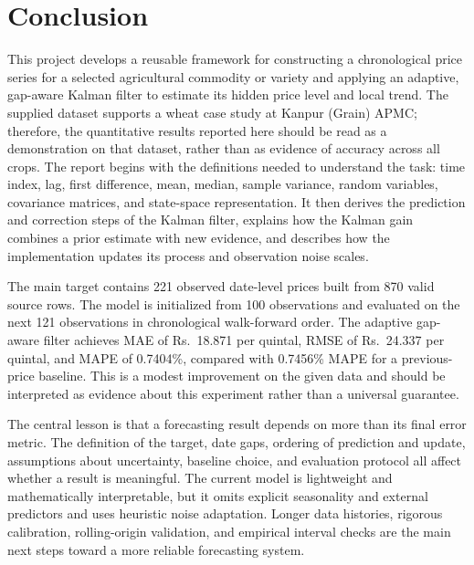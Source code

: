 \documentclass[12pt,a4paper,oneside]{report}
\numberwithin{equation}{chapter}
\numberwithin{figure}{chapter}
\numberwithin{table}{chapter}
\theoremstyle{definition}
\theoremstyle{plain}
\newcommand{\1}{\mathbf{1}}
\begin{document}
\chapter{Conclusion}
This project develops a reusable framework for constructing a chronological price series for a selected agricultural commodity or variety and applying an adaptive, gap-aware Kalman filter to estimate its hidden price level and local trend. The supplied dataset supports a wheat case study at Kanpur (Grain) APMC; therefore, the quantitative results reported here should be read as a demonstration on that dataset, rather than as evidence of accuracy across all crops. The report begins with the definitions needed to understand the task: time index, lag, first difference, mean, median, sample variance, random variables, covariance matrices, and state-space representation. It then derives the prediction and correction steps of the Kalman filter, explains how the Kalman gain combines a prior estimate with new evidence, and describes how the implementation updates its process and observation noise scales.

The main target contains 221 observed date-level prices built from 870 valid source rows. The model is initialized from 100 observations and evaluated on the next 121 observations in chronological walk-forward order. The adaptive gap-aware filter achieves MAE of Rs.\ 18.871 per quintal, RMSE of Rs.\ 24.337 per quintal, and MAPE of 0.7404\%, compared with 0.7456\% MAPE for a previous-price baseline. This is a modest improvement on the given data and should be interpreted as evidence about this experiment rather than a universal guarantee.

The central lesson is that a forecasting result depends on more than its final error metric. The definition of the target, date gaps, ordering of prediction and update, assumptions about uncertainty, baseline choice, and evaluation protocol all affect whether a result is meaningful. The current model is lightweight and mathematically interpretable, but it omits explicit seasonality and external predictors and uses heuristic noise adaptation. Longer data histories, rigorous calibration, rolling-origin validation, and empirical interval checks are the main next steps toward a more reliable forecasting system.

\appendix
\end{document}

